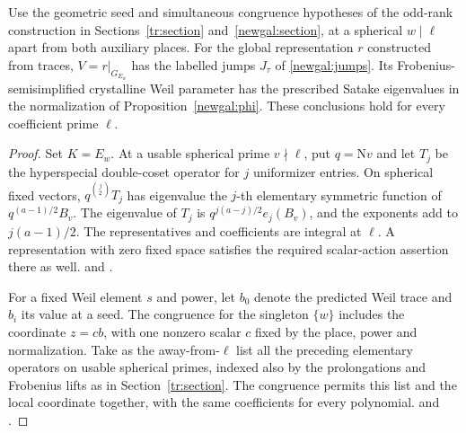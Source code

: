 \begin{proposition}
\label{addg:local}
Use the geometric seed and simultaneous congruence hypotheses of the
odd-rank construction in Sections~\ref{tr:section} and~\ref{newgal:section},
at a spherical \(w\mid\ell\) apart from both auxiliary places. For the
global representation \(r\) constructed from traces, \(V=r|_{G_{E_w}}\)
has the labelled jumps \(J_\tau\) of \eqref{newgal:jumps}. Its
Frobenius-semisimplified crystalline Weil parameter has the prescribed
Satake eigenvalues in the normalization of Proposition~\ref{newgal:phi}.
These conclusions hold for every coefficient prime \(\ell\).
\end{proposition}
\begin{proof}
Set \(K=E_w\). At a usable spherical prime \(v\nmid\ell\), put
\(q=\mathrm N v\) and let \(T_j\) be the hyperspecial double-coset
operator for \(j\) uniformizer entries. On spherical fixed vectors,
\(q^{\binom j2}T_j\) has eigenvalue the \(j\)-th elementary symmetric
function of \(q^{(a-1)/2}B_v\). The eigenvalue of \(T_j\) is
\(q^{j(a-j)/2}e_j(B_v)\), and the exponents
add to \(j(a-1)/2\). The representatives and coefficients are integral
at \(\ell\). A representation with zero fixed space satisfies the required
scalar-action assertion there as well.
and .

For a fixed Weil element \(s\) and power, let \(b_0\) denote the
predicted Weil trace and \(b_i\) its value at a seed. The congruence for
the singleton \(\{w\}\) includes the coordinate \(z=cb\), with one
nonzero scalar \(c\) fixed by the place, power and normalization. Take
as the away-from-\(\ell\) list all the preceding elementary operators on
usable spherical primes, indexed also by the prolongations and Frobenius
lifts as in Section~\ref{tr:section}. The congruence permits this list
and the local coordinate together, with the same coefficients for every
polynomial.
and .


\end{proof}
